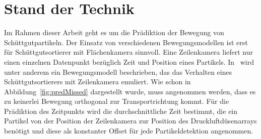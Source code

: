 \section{Stand der Technik}
\label{cap:relWork}








Im Rahmen dieser Arbeit geht es um die Prädiktion der Bewegung von Schüttgutpartikeln.
Der Einsatz von verschiedenen Bewegungsmodellen ist erst für Schüttgutsortierer mit Flächenkamera sinnvoll.
Eine Zeilenkamera liefert nur einen einzelnen Datenpunkt bezüglich Zeit und Position eines Partikels.
In~\cite{Pfaff2018} wird unter anderem ein Bewegungsmodell beschrieben, das das Verhalten eines Schüttgutsortierers mit Zeilenkamera emuliert.
Wie schon in Abbildung~\ref{fig:predMissed} dargestellt wurde, muss angenommen werden, dass es zu keinerlei Bewegung orthogonal zur Transportrichtung kommt.
Für die Prädiktion des Zeitpunkts wird die durchschnittliche Zeit bestimmt, die ein Partikel von der Position der Zeilenkamera zur Position des Druckluftdüsenarrays benötigt 
und diese als konstanter Offset für jede Partikeldetektion angenommen.

